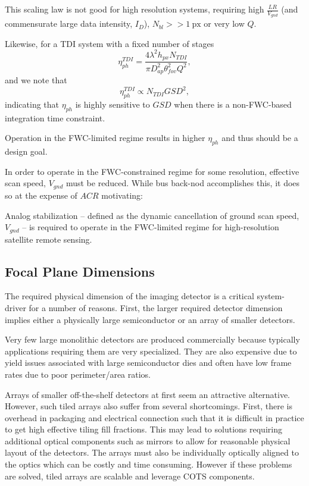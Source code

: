 \documentclass[10pt,journal]{IEEEtran}  %
\begin{document}
This scaling law is not good for high resolution systems, requiring high $\frac{LR}{V_{gnd}}$ (and commensurate large data intensity, $I_{D}$), $N_{bl} >> 1 \: \textrm{px}$ or very low $Q$.

Likewise, for a TDI system with a fixed number of stages
\begin{equation}
    \eta_{ph}^{TDI} = \frac{4\lambda^2 h_{px} N_{TDI}}{\pi D_{ap}^2 \theta_{fov}^2 Q^2},
\end{equation}
and we note that 
\begin{equation}
    \label{eq:eta_ph_tdi_scaling}
    \eta_{ph}^{TDI} \propto N_{TDI} GSD^2,
\end{equation}
indicating that $\eta_{ph}$ is highly sensitive to $GSD$ when there is a non-FWC-based integration time constraint.

\begin{observation}
Operation in the FWC-limited regime results in higher $\eta_{ph}$ and thus should be a design goal.
\end{observation}

In order to operate in the FWC-constrained regime for some resolution, effective scan speed, $V_{gnd}$ must be reduced.  While bus back-nod accomplishes this, it does so at the expense of $ACR$ motivating:

\begin{observation}
Analog stabilization -- defined as the dynamic cancellation of ground scan speed, $V_{gnd}$ -- is required to operate in the FWC-limited regime for high-resolution satellite remote sensing.
\end{observation}

\subsection{Focal Plane Dimensions}
The required physical dimension of the imaging detector is a critical system-driver for a number of reasons.  First, the larger required detector dimension implies either a physically large semiconductor or an array of smaller detectors.  

Very few large monolithic detectors are produced commercially because typically applications requiring them are very specialized.  They are also expensive due to yield issues associated with large semiconductor dies and often have low frame rates due to poor perimeter/area ratios.

Arrays of smaller off-the-shelf detectors at first seem an attractive alternative.  However, such tiled arrays also suffer from several shortcomings.  First, there is overhead in packaging and electrical connection such that it is difficult in practice to get high effective tiling fill fractions.  This may lead to solutions requiring additional optical components such as mirrors to allow for reasonable physical layout of the detectors.  The arrays must also be individually optically aligned to the optics which can be costly and time consuming. However if these problems are solved, tiled arrays are scalable and leverage COTS components.
\end{document}
